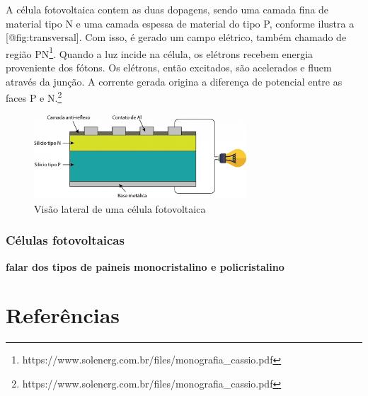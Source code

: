\documentclass[
]{article}
\begin{document}
A célula fotovoltaica contem as duas dopagens, sendo uma camada fina de
material tipo N e uma camada espessa de material do tipo P, conforme
ilustra a {[}@fig:transversal{]}. Com isso, é gerado um campo elétrico,
também chamado de região PN\footnote{https://www.solenerg.com.br/files/monografia\_cassio.pdf}.
Quando a luz incide na célula, os elétrons recebem energia proveniente
dos fótons. Os elétrons, então excitados, são acelerados e fluem através
da junção. A corrente gerada origina a diferença de potencial entre as
faces P e N.\footnote{https://www.solenerg.com.br/files/monografia\_cassio.pdf}

\begin{figure}
\hypertarget{fig:transversal}{%
\centering
\includegraphics[width=3.125in,height=\textheight]{img/fotovoltaico/placatransversal.png}
\caption{Visão lateral de uma célula
fotovoltaica}\label{fig:transversal}
}
\end{figure}

\hypertarget{cuxe9lulas-fotovoltaicas}{%
\subsubsection{Células fotovoltaicas}\label{cuxe9lulas-fotovoltaicas}}

\textbf{falar dos tipos de paineis monocristalino e policristalino}

\hypertarget{referuxeancias}{%
\section{Referências}\label{referuxeancias}}
\end{document}
